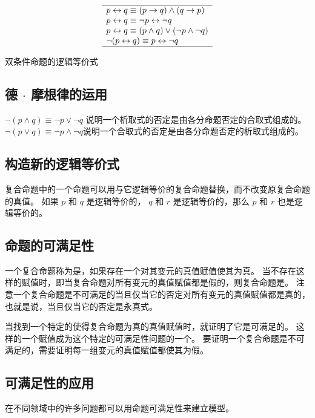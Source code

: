 {{\begin{minipage}[c]{\textwidth{}}
\begin{minipage}[c]{.4\textwidth{}}
\begin{minipage}[c]{\textwidth{}}
\begin{table}[H]
                        \[
                            \begin{array}{l}
                                \hline
                                p \leftrightarrow q \equiv (p \rightarrow q) \wedge (q \rightarrow p) \\
                                p \leftrightarrow q \equiv \neg p \leftrightarrow \neg q \\
                                p \leftrightarrow q \equiv (p \wedge q) \vee (\neg p \wedge \neg q) \\
                                \neg (p \leftrightarrow q) \equiv p \leftrightarrow \neg q \\
                                \hline
                            \end{array}
                        \]

                        \caption{双条件命题的逻辑等价式}
                    \end{table}
                \end{minipage}
            \end{minipage}
        \end{minipage}
    }

    \subsection{德 $\cdot$ 摩根律的运用}
    {
        $\neg (p \wedge q) \equiv \neg p \vee \neg q$ 说明一个析取式的否定是由各分命题否定的合取式组成的。
        $\neg (p \vee q) \equiv \neg p \wedge \neg q$说明一个合取式的否定是由各分命题否定的析取式组成的。
    }

    \subsection{构造新的逻辑等价式}
    {
        复合命题中的一个命题可以用与它逻辑等价的复合命题替换，而不改变原复合命题的真值。
        如果 $p$ 和 $q$ 是逻辑等价的， $q$ 和 $r$ 是逻辑等价的，那么 $p$ 和 $r$ 也是逻辑等价的。
    }

    \subsection{命题的可满足性}
    {
        一个复合命题称为是，如果存在一个对其变元的真值赋值使其为真。
        当不存在这样的赋值时，即当复合命题对所有变元的真值赋值都是假的，则复合命题是。
        注意一个复合命题是不可满足的当且仅当它的否定对所有变元的真值赋值都是真的，也就是说，当且仅当它的否定是永真式。

        当找到一个特定的使得复合命题为真的真值赋值时，就证明了它是可满足的。
        这样的一个赋值成为这个特定的可满足性问题的一个。
        要证明一个复合命题是不可满足的，需要证明每一组变元的真值赋值都使其为假。
    }

    \subsection{可满足性的应用}
    {
        在不同领域中的许多问题都可以用命题可满足性来建立模型。
    }
}
